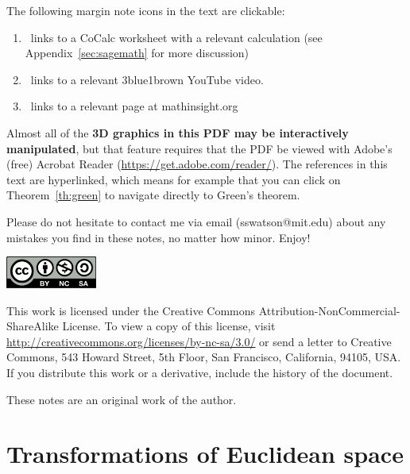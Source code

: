 \documentclass[svgnames]{watsonbook}
\begin{document}
The following margin note icons in the text are clickable:
\begin{enumerate}[itemsep=6pt, topsep = -6pt]
  \item \href{http://cocalc.com}{\cocalc}\,
links to a CoCalc worksheet with a relevant calculation (see Appendix~\ref{sec:sagemath} for more
discussion)
\item \href{http://3blue1brown.com}{\tbob} \, links to a relevant 3blue1brown YouTube video.
\item \href{http://mathinsight.org}{\mi} \, links to a relevant page at mathinsight.org
\end{enumerate}

\vspace{6pt}

Almost all of the \textbf{3D graphics in this PDF may be interactively manipulated},
but that feature requires that the PDF be viewed with Adobe's (free) Acrobat
Reader
(\href{https://get.adobe.com/reader/}{\url{https://get.adobe.com/reader/}}). The
references in this text are hyperlinked, which means for example that you can click on
Theorem~\ref{th:green} to navigate directly to Green's theorem. 

Please do not hesitate to contact me via email (sswatson@mit.edu)
about any mistakes you find in these notes, no matter how
minor. Enjoy!

\newpage

\null\vfill

\includegraphics[width=3cm]{figures/cc-by-nc-sa.pdf} \\
{\small
This work is licensed under the Creative Commons
Attribution-NonCommercial-ShareAlike License. To view a copy of this
license, visit 
\url{http://creativecommons.org/licenses/by-nc-sa/3.0/} 
or
send a letter to Creative Commons, 543 Howard Street, 5th Floor, San
Francisco, California, 94105, USA. If you distribute this work or a
derivative, include the history of the document.

These notes are an original work of the author. 
}

\vspace{5cm}


\newpage 

\tableofcontents

\newpage 

\chapter{Transformations of Euclidean space}
\end{document}
